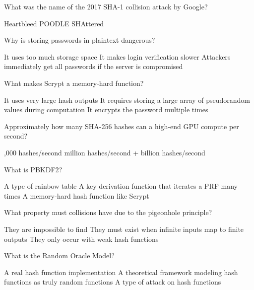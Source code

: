 \documentclass[10pt,a4paper,american]{exam}
\begin{document}
\begin{questions}
	\question What was the name of the 2017 SHA-1 collision attack by Google?
	\begin{randomizechoices}
		\choice Heartbleed
		\choice POODLE
		\CorrectChoice SHAttered
	\end{randomizechoices}

	\question Why is storing passwords in plaintext dangerous?
	\begin{randomizechoices}
		\choice It uses too much storage space
		\choice It makes login verification slower
		\CorrectChoice Attackers immediately get all passwords if the server is compromised
	\end{randomizechoices}

	\question What makes Scrypt a memory-hard function?
	\begin{randomizechoices}
		\choice It uses very large hash outputs
		\CorrectChoice It requires storing a large array of pseudorandom values during computation
		\choice It encrypts the password multiple times
	\end{randomizechoices}

	\question Approximately how many SHA-256 hashes can a high-end GPU compute per second?
	\begin{randomizechoices}
		,000 hashes/second
		 million hashes/second
		+ billion hashes/second
	\end{randomizechoices}

	\question What is PBKDF2?
	\begin{randomizechoices}
		\choice A type of rainbow table
		\CorrectChoice A key derivation function that iterates a PRF many times
		\choice A memory-hard hash function like Scrypt
	\end{randomizechoices}

	\question What property must collisions have due to the pigeonhole principle?
	\begin{randomizechoices}
		\choice They are impossible to find
		\CorrectChoice They must exist when infinite inputs map to finite outputs
		\choice They only occur with weak hash functions
	\end{randomizechoices}

	\question What is the Random Oracle Model?
	\begin{randomizechoices}
		\choice A real hash function implementation
		\CorrectChoice A theoretical framework modeling hash functions as truly random functions
		\choice A type of attack on hash functions
	\end{randomizechoices}


\end{questions}
\end{document}
